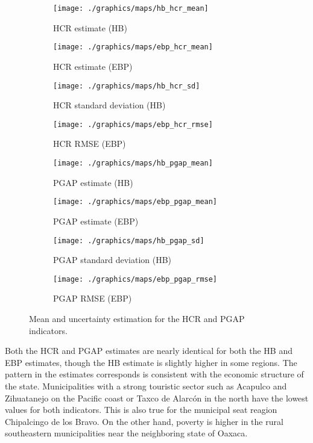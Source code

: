 \begin{figure}
    \begin{subfigure}{0.49\linewidth}
        \centering
        \texttt{[image: ./graphics/maps/hb\_hcr\_mean]}
        \caption{HCR estimate (HB)}
    \end{subfigure}
    \begin{subfigure}{0.49\linewidth}
        \centering
        \texttt{[image: ./graphics/maps/ebp\_hcr\_mean]}
        \caption{HCR estimate (EBP)}
    \end{subfigure}

    \begin{subfigure}{0.49\linewidth}
        \centering
        \texttt{[image: ./graphics/maps/hb\_hcr\_sd]}
        \caption{HCR standard deviation (HB)}
    \end{subfigure}
    \begin{subfigure}{0.49\linewidth}
        \centering
        \texttt{[image: ./graphics/maps/ebp\_hcr\_rmse]}
        \caption{HCR RMSE (EBP)}
    \end{subfigure}

    \begin{subfigure}{0.49\linewidth}
        \centering
        \texttt{[image: ./graphics/maps/hb\_pgap\_mean]}
        \caption{PGAP estimate (HB)}
    \end{subfigure}
    \begin{subfigure}{0.49\linewidth}
        \centering
        \texttt{[image: ./graphics/maps/ebp\_pgap\_mean]}
        \caption{PGAP estimate (EBP)}
    \end{subfigure}

    \begin{subfigure}{0.49\linewidth}
        \centering
        \texttt{[image: ./graphics/maps/hb\_pgap\_sd]}
        \caption{PGAP standard deviation (HB)}
    \end{subfigure}
    \begin{subfigure}{0.49\linewidth}
        \centering
        \texttt{[image: ./graphics/maps/ebp\_pgap\_rmse]}
        \caption{PGAP RMSE (EBP)}
    \end{subfigure}
    \caption{Mean and uncertainty estimation for the HCR and PGAP indicators.}
    \label{fig:maps}
\end{figure}

Both the HCR and PGAP estimates are nearly identical for both the HB and EBP estimates, though the HB estimate is slightly higher in some regions.
The pattern in the estimates corresponds is consistent with the economic structure of the state.
Municipalities with a strong touristic sector such as Acapulco and Zihuatanejo on the Pacific coast or Taxco de Alarcón in the north have the lowest values for both indicators.
This is also true for the municipal seat reagion Chipalcingo de los Bravo.
On the other hand, poverty is higher in the rural southeastern municipalities near the neighboring state of Oaxaca.

